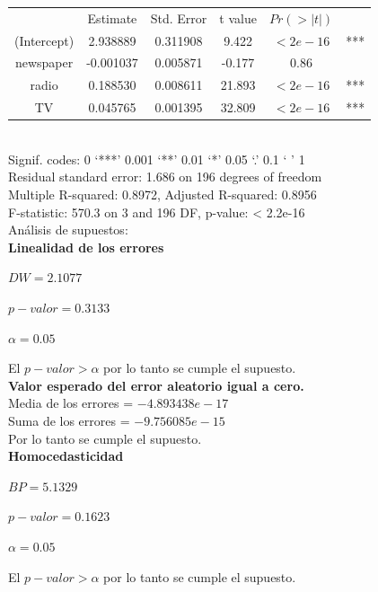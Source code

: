 \documentclass[12pt,a4paper]{article}
\begin{document}
	\begin{tabular}{cccccc}
		&     Estimate & Std. Error&     t value&   $Pr(>|t|)$&\\
		(Intercept) & 2.938889 &  0.311908 &  9.422  & $<2e-16$ &***\\
		newspaper   &-0.001037 &  0.005871 & -0.177  &   0.86 &\\ 
		radio       & 0.188530 &  0.008611 & 21.893  & $<2e-16$ &***\\
		TV          & 0.045765 &  0.001395 & 32.809  &$<2e-16$ &***\\
	\end{tabular}\\
	
	Signif. codes:  0 ‘***’ 0.001 ‘**’ 0.01 ‘*’ 0.05 ‘.’ 0.1 ‘ ’ 1\\
	
	Residual standard error: 1.686 on 196 degrees of freedom\\
	
	Multiple R-squared:  0.8972,	Adjusted R-squared:  0.8956\\
	 
	F-statistic: 570.3 on 3 and 196 DF,  p-value: < 2.2e-16\\
	
	Análisis de supuestos:\\
	
	\textbf{Linealidad de los errores}
	\begin{center}
		$DW = 2.1077$
		
		$p-valor = 0.3133$
		
		$\alpha = 0.05$
	\end{center}
	El $p-valor > \alpha$ por lo tanto se cumple el supuesto.\\
	
	\textbf{Valor esperado del error aleatorio igual a cero.}\\
	Media de los errores = $-4.893438e-17$\\
	Suma de los errores = $-9.756085e-15$\\
	Por lo tanto se cumple el supuesto.\\
	
	\textbf{Homocedasticidad}\\
	\begin{center}
		$BP = 5.1329$
		
		$p-valor = 0.1623$
		
		$\alpha = 0.05$
	\end{center}
	El $p-valor > \alpha$ por lo tanto se cumple el supuesto.\\
	
\end{document}
